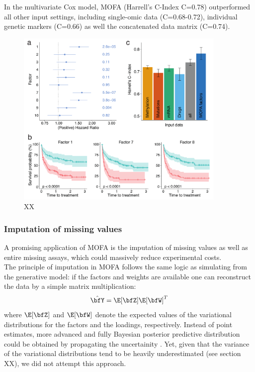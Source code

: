 In the multivariate Cox model, MOFA (Harrell’s C-Index C=0.78) outperformed all other input settings, including single-omic data (C=0.68-0.72), individual genetic markers (C=0.66) as well the concatenated data matrix (C=0.74).


\begin{figure}[H]
	\centering 	
	\includegraphics[width=0.9\textwidth]{MOFA_CLL_Cox}
	\caption{XX}
	\label{fig:MOFA_CLL_Cox}
\end{figure}


\subsubsection{Imputation of missing values}

A promising application of MOFA is the imputation of missing values as well as entire missing assays, which could massively reduce experimental costs.\\
The principle of imputation in MOFA follows the same logic as simulating from the generative model: if the factors and weights are available one can reconstruct the data by a simple matrix multiplication:
\[
	\hat{\bfY} = \E[\bfZ] \E[\bfW]^T
\]
where $\E[\bfZ]$ and $\E[\bfW]$ denote the expected values of the variational distributions for the factors and the loadings, respectively. Instead of point estimates, more advanced and fully Bayesian posterior predictive distribution could be obtained by propagating the uncertainity \cite{Gelman2013}. Yet, given that the variance of the variational distributions tend to be heavily underestimated (see section XX), we did not attempt this approach.\\

